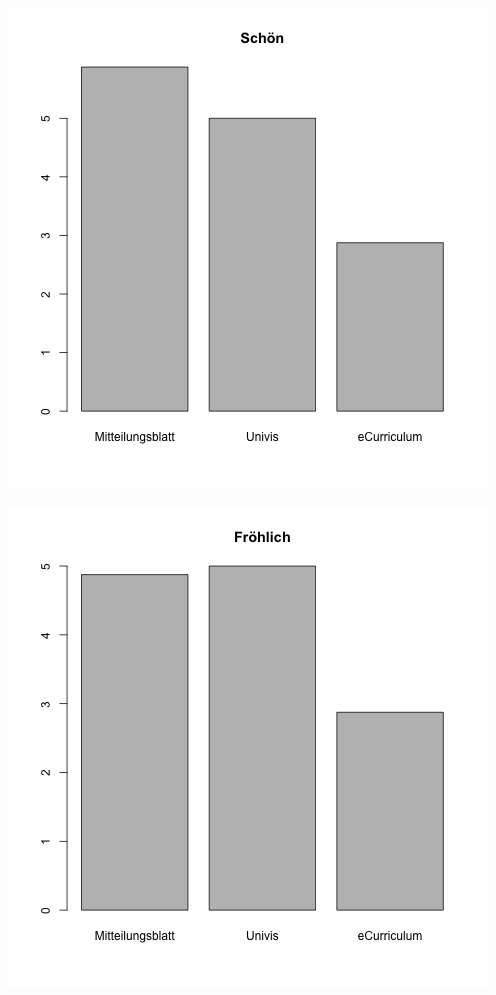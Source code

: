\documentclass[a4paper,10pt]{scrartcl}
\begin{document}
\begin{center}
 \includegraphics[width=\linewidth]{./Appendix/Plots/Barplots/barplot7.png}
\end{center}
\begin{center}
 \includegraphics[width=\linewidth]{./Appendix/Plots/Barplots/barplot8.png}
\end{center}
\end{document}
